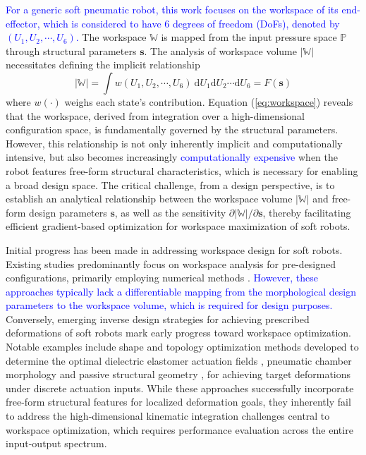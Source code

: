 \documentclass[journal]{IEEEtran}
\theoremstyle{definition}
\begin{document}
\textcolor{blue}{For a generic soft pneumatic robot, this work focuses on the workspace of its end-effector, which is considered to have $6$ degrees of freedom (DoFs), denoted by $(U_1,U_2,\cdots,U_6)$.} The workspace $\mathbb{W}$ is mapped from the input pressure space $\mathbb{P}$ through structural parameters $\mathbf{s}$. The analysis of workspace volume $|\mathbb{W}|$ necessitates defining the implicit relationship
\begin{equation}
|\mathbb{W}| = \int w(U_1,U_2,\cdots,U_6)\ \mathrm{d}U_1 \mathrm{d}U_2 \cdots \mathrm{d}U_6 = F(\mathbf{s})
\label{eq:workspace}
\end{equation}
where $w(\cdot)$ weighs each state's contribution. Equation (\ref{eq:workspace}) reveals that the workspace, derived from integration over a high-dimensional configuration space, is fundamentally governed by the structural parameters. However, this relationship is not only inherently implicit and computationally intensive, but also becomes increasingly \textcolor{blue}{computationally expensive} when the robot features free-form structural characteristics, which is necessary for enabling a broad design space. The critical challenge, from a design perspective, is to establish an analytical relationship between the workspace volume $\left|\mathbb{W}\right|$ and free-form design parameters $\mathbf{s}$, as well as the sensitivity $\partial \left|\mathbb{W}\right|/\partial \mathbf{s}$, thereby facilitating efficient gradient-based optimization for workspace maximization of soft robots.

Initial progress has been made in addressing workspace design for soft robots. Existing studies predominantly focus on workspace analysis for pre-designed configurations, primarily employing numerical methods \textcolor{blue}{\cite{9488225, 10.1115_1.4003414, 9340011}}. \textcolor{blue}{However, these approaches typically lack a differentiable mapping from the morphological design parameters to the workspace volume, which is required for design purposes.} Conversely, emerging inverse design strategies for achieving prescribed deformations of soft robots mark early progress toward workspace optimization. Notable examples include shape and topology optimization methods developed to determine the optimal dielectric elastomer actuation fields \cite{chen2020design, Chen_Wang_Zhang_Chen_2020}, pneumatic chamber morphology \cite{chen_morphological_2023, Caasenbrood_Pogromsky_Nijmeijer_2020} and passive structural geometry \cite{Chen_Chen_Cao_Wang_Miao_Gu_Zhu_2021, KOPPEN2022104743, Kobayashi_Gholami_Montgomery_Tanaka_Yue_Yuhn_Sato_Kawamoto_Qi_Nomura_2024}, for achieving target deformations under discrete actuation inputs. While these approaches successfully incorporate free-form structural features for localized deformation goals, they inherently fail to address the high-dimensional kinematic integration challenges central to workspace optimization, which requires performance evaluation across the entire input-output spectrum.
\end{document}
